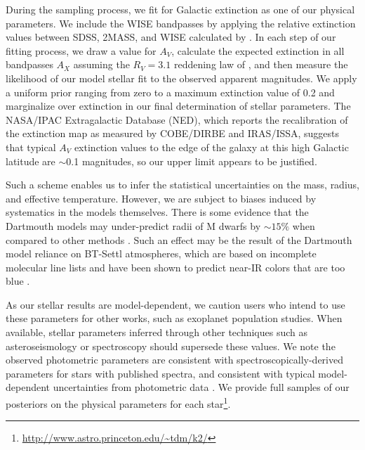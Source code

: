 During the sampling process, we fit for Galactic
extinction as one of our physical parameters.
We include the WISE bandpasses by applying the relative extinction values between
SDSS, 2MASS, and WISE calculated by \citet{Davenport14}.
In each step of our fitting process, we draw a value for $A_V$, calculate the expected extinction
in all bandpasses $A_X$ assuming the $R_V = 3.1$ reddening law of \citep{Fitzpatrick99}, 
and then measure the likelihood of our model stellar fit to the observed apparent magnitudes.
We apply a uniform prior ranging from zero to a maximum extinction value of 0.2 and
marginalize over extinction in our final determination of stellar parameters.
The NASA/IPAC Extragalactic Database (NED), which reports the
\citet{Schlafly11} recalibration of the \citet{Schlegel98} extinction map as measured by
COBE/DIRBE and IRAS/ISSA, suggests that typical $A_V$ extinction values to the edge
of the galaxy at this
high Galactic latitude are $\sim$0.1 magnitudes, so our upper limit appears to be justified.

Such a scheme enables us to infer the statistical uncertainties on the
mass, radius, and effective temperature.
However, we are subject to biases induced by systematics in the models themselves.
There is some evidence that the Dartmouth models may under-predict
radii of M dwarfs by $\sim 15\%$ when compared to other methods \citep{Newton15,
Montet15a}.
Such an effect may be the result of the Dartmouth model reliance on BT-Settl
atmospheres, which are based on incomplete molecular line lists and
have been shown to predict near-IR colors that are too blue
\citep{Thompson14}.

As our stellar results are model-dependent, we caution users who intend to use these
parameters for other works, such as exoplanet population studies. When available,
stellar parameters inferred through other techniques such as asteroseismology or
spectroscopy should supersede these values.
We note the observed photometric parameters are consistent with spectroscopically-derived
parameters for stars with published spectra, and consistent with typical
model-dependent uncertainties
from photometric data \citep[e.g.][]{Huber14}.
We provide full samples of our posteriors on the physical parameters for each
star\footnote{\url{http://www.astro.princeton.edu/~tdm/k2/}}.

